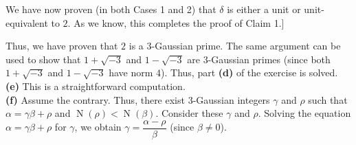 \documentclass[paper=a4, fontsize=12pt]{scrartcl}%
\newcommand{\st}{\sqrt{-3}}
\theoremstyle{plainsl}
\theoremstyle{definition}
\theoremstyle{remark}
\begin{document}
We have now proven (in both Cases 1 and 2) that
$\delta$ is either a unit or unit-equivalent to $2$.
As we know, this completes the proof of Claim 1.]

Thus, we have proven that $2$ is a $3$-Gaussian prime.
The same argument can be used to show that $1 + \st$
and $1 - \st$ are $3$-Gaussian primes (since both
$1 + \st$ and $1 - \st$ have norm $4$).
Thus, part \textbf{(d)} of the exercise is solved.
 \\[0.4cm]

\textbf{(e)} This is a straightforward computation. \\[0.4cm]

\textbf{(f)} Assume the contrary. Thus, there exist
$3$-Gaussian
integers $\gamma$ and $\rho$ such that $\alpha= \gamma\beta+ \rho$ and
$\operatorname{N}\left(  \rho\right)  < \operatorname{N}\left(  \beta\right)
$.
Consider these $\gamma$ and $\rho$.
Solving the equation $\alpha= \gamma\beta+ \rho$ for $\gamma$,
we obtain $\gamma = \dfrac{\alpha - \rho}{\beta}$
(since $\beta \neq 0$).
\end{document}
